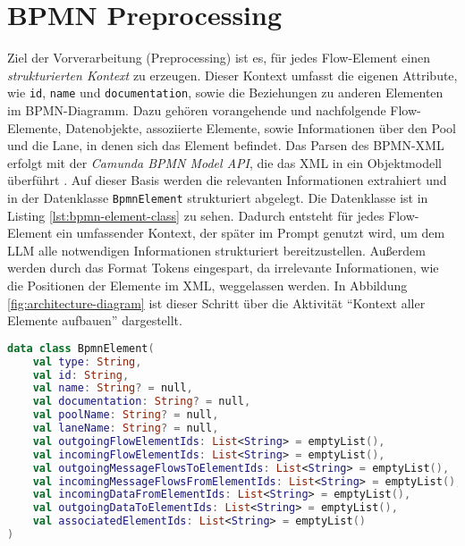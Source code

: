 \section{BPMN Preprocessing}\label{sec:bpmn-preprocessing}

Ziel der Vorverarbeitung (Preprocessing) ist es, für jedes Flow-Element einen \emph{strukturierten Kontext} zu erzeugen. Dieser Kontext umfasst die eigenen Attribute, wie \texttt{id}, \texttt{name} und \texttt{documentation}, sowie die Beziehungen zu anderen Elementen im \ac{BPMN}-Diagramm. Dazu gehören vorangehende und nachfolgende Flow-Elemente, Datenobjekte, assoziierte Elemente, sowie Informationen über den Pool und die Lane, in denen sich das Element befindet. Das Parsen des \ac{BPMN}-XML erfolgt mit der \emph{Camunda BPMN Model API}, die das XML in ein Objektmodell überführt \cite{camunda-bpmn-model-api, camunda-bpmn-model-read}. Auf dieser Basis werden die relevanten Informationen extrahiert und in der Datenklasse \texttt{BpmnElement} strukturiert abgelegt. Die Datenklasse ist in Listing \ref{lst:bpmn-element-class} zu sehen. Dadurch entsteht für jedes Flow-Element ein umfassender Kontext, der später im Prompt genutzt wird, um dem \ac{LLM} alle notwendigen Informationen strukturiert bereitzustellen. Außerdem werden durch das Format Tokens eingespart, da irrelevante Informationen, wie die Positionen der Elemente im XML, weggelassen werden. In Abbildung \ref{fig:architecture-diagram} ist dieser Schritt über die Aktivität \enquote{Kontext aller Elemente aufbauen} dargestellt.

\begin{lstlisting}[language=Kotlin,caption={Interne \ac{BPMN}-Repräsentation je Flow-Element.},label={lst:bpmn-element-class}]
data class BpmnElement(
    val type: String,
    val id: String,
    val name: String? = null,
    val documentation: String? = null,
    val poolName: String? = null,
    val laneName: String? = null,
    val outgoingFlowElementIds: List<String> = emptyList(),
    val incomingFlowElementIds: List<String> = emptyList(),
    val outgoingMessageFlowsToElementIds: List<String> = emptyList(),
    val incomingMessageFlowsFromElementIds: List<String> = emptyList(),
    val incomingDataFromElementIds: List<String> = emptyList(),
    val outgoingDataToElementIds: List<String> = emptyList(),
    val associatedElementIds: List<String> = emptyList()
)
\end{lstlisting}